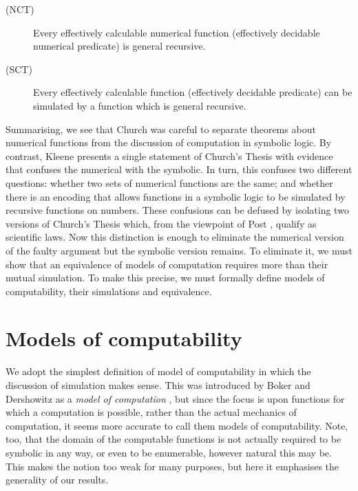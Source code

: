 \documentclass[a4paper]{article}
\begin{document}
\begin{description}
\item [(NCT)]  Every effectively calculable numerical function (effectively decidable numerical predicate) is general recursive. 
\end{description}

\begin{description}
\item [(SCT)]  Every effectively calculable function (effectively decidable predicate) can be simulated by a function which is general recursive. 
\end{description}


Summarising, we see that Church was careful to separate theorems about
numerical functions from the discussion of computation in symbolic
logic. By contrast, Kleene presents a single statement of Church's
Thesis with evidence that confuses the numerical with the symbolic.
In turn, this confuses two different questions: whether two sets of
numerical functions are the same; and whether there is an encoding
that allows functions in a symbolic logic to be simulated by recursive
functions on numbers.  These confusions can be defused by isolating
two versions of Church's Thesis which, from the viewpoint of Post
\cite{post}, qualify as scientific laws. Now this distinction is
enough to eliminate the numerical version of the faulty argument but
the symbolic version remains.  To eliminate it, we must show that an
equivalence of models of computation requires more than their mutual
simulation.  To make this precise, we must formally define models of
computability, their simulations and equivalence.


\section{Models of computability} 
\label{sec:models}

We adopt the simplest definition of model of computability in which
the discussion of simulation makes sense. This was introduced by
Boker and Dershowitz as a {\em model of computation} \cite{BokerD06},
but since the focus is upon functions for which a computation is
possible, rather than the actual mechanics of computation, it seems
more accurate to call them models of computability. Note, too, that
the domain of the computable functions is not actually required to be
symbolic in any way, or even to be enumerable, however natural this
may be. This makes the notion too weak for many purposes, but here it
emphasises the generality of our results. 
\end{document}
